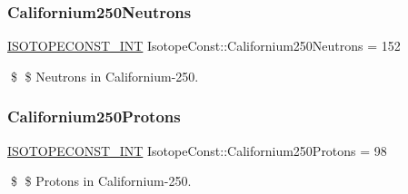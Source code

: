 \subsubsection{\texorpdfstring{Californium250\+Neutrons}{Californium250Neutrons}}
{\footnotesize\ttfamily \mbox{\hyperlink{group___isotope_const-_macros_ga5f18360b3e99483a35c32d789e62621c}{I\+S\+O\+T\+O\+P\+E\+C\+O\+N\+S\+T\+\_\+\+I\+NT}} Isotope\+Const\+::\+Californium250\+Neutrons = 152}

\$ \$ Neutrons in Californium-\/250. \mbox{\label{group___isotope_const-_californium-_cf250_gaa844cd9b7ab0108783eadbce185651ac}} 
\subsubsection{\texorpdfstring{Californium250\+Protons}{Californium250Protons}}
{\footnotesize\ttfamily \mbox{\hyperlink{group___isotope_const-_macros_ga5f18360b3e99483a35c32d789e62621c}{I\+S\+O\+T\+O\+P\+E\+C\+O\+N\+S\+T\+\_\+\+I\+NT}} Isotope\+Const\+::\+Californium250\+Protons = 98}

\$ \$ Protons in Californium-\/250. 